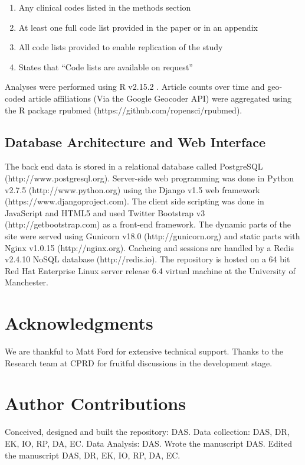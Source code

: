 \documentclass[10pt]{article}
\begin{document}
\begin{enumerate}
    \item Any clinical codes listed in the methods section
    \item At least one full code list provided in the paper or in an appendix
    \item All code lists provided to enable replication of the study
    \item States that ``Code lists are available on request'' 
\end{enumerate}

Analyses were performed using R v2.15.2 \cite{R2012}. Article counts over time and geo-coded article affiliations (Via the Google Geocoder API) were aggregated using the R package rpubmed (https://github.com\slash ropensci/rpubmed).

\subsection*{Database Architecture and Web Interface}

The back end data is stored in a relational database called PostgreSQL (http://www.postgresql.org). Server-side web programming was done in Python v2.7.5 (http://www.python.org) using the Django v1.5 web framework (https://www.djangoproject.com). The client side scripting was done in JavaScript and HTML5 and used Twitter Bootstrap v3 (http://getbootstrap.com) as a front-end framework.  The dynamic parts of the site were served using Gunicorn v18.0 (http://gunicorn.org) and static parts with Nginx v1.0.15 (http://nginx.org). Cacheing and sessions are handled by a Redis v2.4.10 NoSQL database (http://redis.io). The repository is hosted on a 64 bit Red Hat Enterprise Linux server release 6.4 virtual machine at the University of Manchester. 


\section*{Acknowledgments}
We are thankful to Matt Ford for extensive technical support. Thanks to the Research team at CPRD for fruitful discussions in the development stage.

\section*{Author Contributions}

Conceived, designed and built the repository: DAS. Data collection: DAS, DR, EK, IO, RP, DA, EC.  Data Analysis: DAS. Wrote the manuscript DAS. Edited the manuscript DAS, DR, EK, IO, RP, DA, EC.
\end{document}

